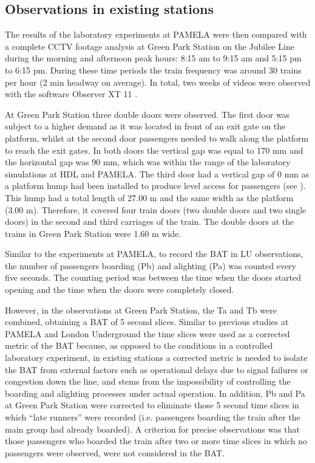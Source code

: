 \subsection{Observations in existing stations}
\label{sec:3.2}

The results of the laboratory experiments at PAMELA were then compared with a complete CCTV footage analysis at Green Park Station on the Jubilee Line during the morning and afternoon peak hours: 8:15 am to 9:15 am and 5:15 pm to 6:15 pm. During these time periods the train frequency was around 30 trains per hour (2 min headway on average). In total, two weeks of videos were observed with the software Observer XT 11 \cite{Ref42}. 

At Green Park Station three double doors were observed. The first door was subject to a higher demand as it was located in front of an exit gate on the platform, whilst at the second door passengers needed to walk along the platform to reach the exit gates. In both doors the vertical gap was equal to 170 mm and the horizontal gap was 90 mm, which was within the range of the laboratory simulations at HDL and PAMELA. The third door had a vertical gap of 0 mm as a platform hump had been installed to produce level access for passengers (see ). This hump had a total length of 27.00 m and the same width as the platform (3.00 m). Therefore, it covered four train doors (two double doors and two single doors) in the second and third carriages of the train. The double doors at the trains in Green Park Station were 1.60 m wide.

Similar to the experiments at PAMELA, to record the BAT in LU observations, the number of passengers boarding (Pb) and alighting (Pa) was counted every five seconds. The counting period was between the time when the doors started opening and the time when the doors were completely closed. 

However, in the observations at Green Park Station, the Ta and Tb were combined, obtaining a BAT of 5 second slices. Similar to previous studies at PAMELA and London Underground \cite{Ref27,Ref28,Ref29} the time slices were used as a corrected metric of the BAT because, as opposed to the conditions in a controlled laboratory experiment, in existing stations a corrected metric is needed to isolate the BAT from external factors such as operational delays due to signal failures or congestion down the line, and stems from the impossibility of controlling the boarding and alighting processes under actual operation. In addition, Pb and Pa at Green Park Station were corrected to eliminate those 5 second time slices in which “late runners” were recorded (i.e. passengers boarding the train after the main group had already boarded). A criterion for precise observations was that those passengers who boarded the train after two or more time slices in which no passengers were observed, were not considered in the BAT. 


